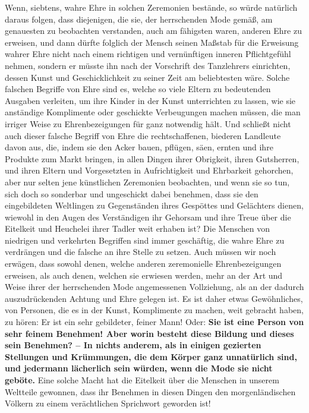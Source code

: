 Wenn, siebtens, wahre Ehre in solchen Zeremonien bestände, so würde natürlich
daraus folgen, dass diejenigen, die sie, der herrschenden Mode gemäß, am
genauesten zu beobachten verstanden, auch am fähigsten waren, anderen Ehre zu
erweisen, und dann dürfte folglich der Mensch seinen Maßstab für die Erweisung
wahrer Ehre nicht nach einem richtigen und vernünftigen inneren Pflichtgefühl
nehmen, sondern er müsste ihn nach der Vorschrift des Tanzlehrers einrichten,
dessen Kunst und Geschicklichkeit zu seiner Zeit am beliebtesten wäre. Solche
falschen Begriffe von Ehre sind es, welche so viele
Eltern
zu bedeutenden
Ausgaben verleiten, um ihre Kinder in der Kunst unterrichten zu lassen, wie sie
anständige Komplimente oder geschickte Verbeugungen machen müssen, die man
irriger Weise zu Ehrenbezeigungen für ganz notwendig hält.
 Und schließt nicht
auch dieser falsche Begriff von Ehre die rechtschaffenen, biederen Landleute
davon aus, die, indem sie den Acker bauen, pflügen, säen, ernten und ihre
Produkte zum Markt bringen, in allen Dingen ihrer Obrigkeit, ihren Gutsherren,
und ihren Eltern und Vorgesetzten in Aufrichtigkeit und Ehrbarkeit gehorchen,
aber nur selten jene künstlichen Zeremonien beobachten, und wenn sie so tun,
sich doch so sonderbar und ungeschickt dabei benehmen, dass sie den
eingebildeten Weltlingen zu Gegenständen ihres Gespöttes und Gelächters dienen,
wiewohl in den Augen des Verständigen ihr Gehorsam und ihre Treue über die
Eitelkeit und Heuchelei ihrer Tadler weit erhaben ist? Die Menschen von
niedrigen und verkehrten Begriffen sind immer geschäftig, die wahre Ehre zu
verdrängen und die falsche an ihre Stelle zu setzen. Auch müssen wir noch
erwägen, dass sowohl denen, welche anderen zeremonielle Ehrenbezeigungen
erweisen,
als auch denen, welchen sie erwiesen werden, mehr an der Art und Weise ihrer der
herrschenden Mode angemessenen Vollziehung, als an der dadurch auszudrückenden
Achtung und Ehre gelegen ist. Es ist daher etwas Gewöhnliches, von Personen, die
es in der Kunst, Komplimente zu machen, weit gebracht haben, zu hören: Er ist
ein sehr gebildeter, feiner Mann!
Oder: \label{ref:09_26_feines_benemen} \textbf{Sie ist
eine Person von sehr feinem
Benehmen! Aber worin besteht diese Bildung und dieses sein Benehmen? -- In
nichts anderem, als in einigen gezierten Stellungen und Krümmungen, die dem
Körper ganz unnatürlich sind, und jedermann lächerlich sein würden, wenn die
Mode
sie nicht geböte.} Eine solche Macht hat die Eitelkeit über die Menschen in
unserem Weltteile gewonnen, dass ihr Benehmen in diesen Dingen den
morgenländischen Völkern zu einem verächtlichen Sprichwort geworden ist!

